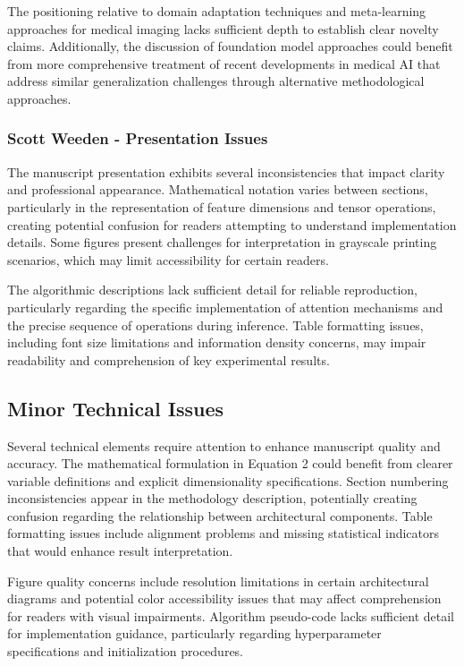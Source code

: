 The positioning relative to domain adaptation techniques and meta-learning approaches for medical imaging lacks sufficient depth to establish clear novelty claims. Additionally, the discussion of foundation model approaches could benefit from more comprehensive treatment of recent developments in medical AI that address similar generalization challenges through alternative methodological approaches.

\subsubsection{Scott Weeden - Presentation Issues}
The manuscript presentation exhibits several inconsistencies that impact clarity and professional appearance. Mathematical notation varies between sections, particularly in the representation of feature dimensions and tensor operations, creating potential confusion for readers attempting to understand implementation details. Some figures present challenges for interpretation in grayscale printing scenarios, which may limit accessibility for certain readers.

The algorithmic descriptions lack sufficient detail for reliable reproduction, particularly regarding the specific implementation of attention mechanisms and the precise sequence of operations during inference. Table formatting issues, including font size limitations and information density concerns, may impair readability and comprehension of key experimental results.

\subsection{Minor Technical Issues}
Several technical elements require attention to enhance manuscript quality and accuracy. The mathematical formulation in Equation 2 could benefit from clearer variable definitions and explicit dimensionality specifications. Section numbering inconsistencies appear in the methodology description, potentially creating confusion regarding the relationship between architectural components. Table formatting issues include alignment problems and missing statistical indicators that would enhance result interpretation.

Figure quality concerns include resolution limitations in certain architectural diagrams and potential color accessibility issues that may affect comprehension for readers with visual impairments. Algorithm pseudo-code lacks sufficient detail for implementation guidance, particularly regarding hyperparameter specifications and initialization procedures.

